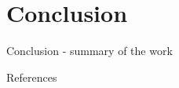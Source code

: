 \documentclass[AIRbeamer
,optEnglish
,optBiber
,optBibstyleAlphabetic
,optBeamerClassicFormat%
]{AIRlatex}
\begin{document}
    \section{Conclusion}
    \begin{frame}{Conclusion}
        - summary of the work
    \end{frame}


    \begin{frame}[allowframebreaks]{References}
        \printbibliography[heading=none]
    \end{frame}%

    \AIRbeamerTitlePageStudentThesis%
\end{document}
